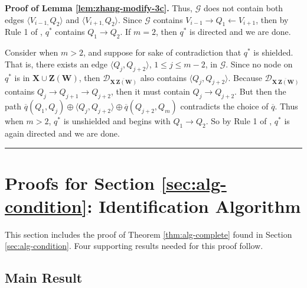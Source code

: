\documentclass[11pt]{article}
\newcommand{\BlackBox}{\rule{1.5ex}{1.5ex}}  %
\newcommand{\mb}[1]{\mathbf{#1}}
\newcommand{\g}[1][G]{\mathcal{#1}}
\newenvironment{proofof}[1][]{\noindent \textbf{Proof of #1.}}{\hfill\BlackBox}
\begin{document}
\begin{proofof}[Lemma \ref{lem:zhang-modify-3c}]
    Thus, $\g$ does not contain both edges $\langle V_{i-1,} Q_2 \rangle$ and $\langle V_{i+1,} Q_2 \rangle$. Since $\g$ contains $V_{i-1} \to Q_1 \gets V_{i+1}$, then by Rule 1 of \cite{meek1995causal}, $q^*$ contains $Q_1 \to Q_2$. If $m=2$, then $q^*$ is directed and we are done.

    Consider when $m>2$, and suppose for sake of contradiction that $q^*$ is shielded. That is, there exists an edge $\langle Q_j, Q_{j+2} \rangle$, $1 \le j \le m-2$, in $\g$. Since no node on $q^*$ is in $\mb{X} \cup \mb{Z(W)}$, then $\g[D]_{\overline{\mb{X \, Z(W)}}}$ also contains $\langle Q_j, Q_{j+2} \rangle$. Because $\g[D]_{\overline{\mb{X \, Z(W)}}}$ contains $Q_j \to Q_{j+1} \to Q_{j+2}$, then it must contain $Q_j \to Q_{j+2}$. But then the path $\overline{q}(Q_1, Q_j) \oplus \langle Q_j, Q_{j+2} \rangle \oplus \overline{q}(Q_{j+2}, Q_m)$ contradicts the choice of $\overline{q}$. Thus when $m>2$, $q^*$ is unshielded and begins with $Q_1 \to Q_2$. So by Rule 1 of \cite{meek1995causal}, $q^*$ is again directed and we are done.
\end{proofof}











\section{Proofs for Section \ref{sec:alg-condition}: Identification Algorithm}
\label{app:alg}

This section includes the proof of Theorem \ref{thm:alg-complete} found in Section \ref{sec:alg-condition}. Four supporting results needed for this proof follow. 



\subsection{Main Result}
\end{document}
